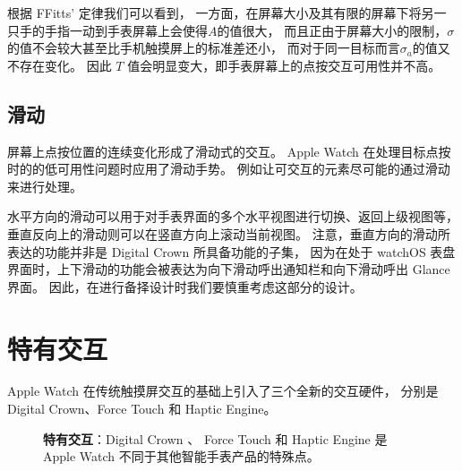根据 FFitts' 定律我们可以看到，
一方面，在屏幕大小及其有限的屏幕下将另一只手的手指一动到手表屏幕上会使得$A$的值很大，
而且正由于屏幕大小的限制，$\sigma$的值不会较大甚至比手机触摸屏上的标准差还小，
而对于同一目标而言$\sigma_a$的值又不存在变化。
因此 $T$ 值会明显变大，即手表屏幕上的点按交互可用性并不高。

\subsection{滑动}

屏幕上点按位置的连续变化形成了滑动式的交互。
Apple Watch 在处理目标点按时的的低可用性问题时应用了滑动手势。
例如让可交互的元素尽可能的通过滑动来进行处理。

水平方向的滑动可以用于对手表界面的多个水平视图进行切换、返回上级视图等，
垂直反向上的滑动则可以在竖直方向上滚动当前视图。
注意，垂直方向的滑动所表达的功能并非是 Digital Crown 所具备功能的子集，
因为在处于 watchOS 表盘界面时，上下滑动的功能会被表达为向下滑动呼出通知栏和向下滑动呼出 Glance 界面。
因此，在进行备择设计时我们要慎重考虑这部分的设计。

\section{特有交互}

Apple Watch 在传统触摸屏交互的基础上引入了三个全新的交互硬件，
分别是Digital Crown、Force Touch 和 Haptic Engine。

\begin{figure}[H]
    \kaishu
    \centering
    \caption{\textbf{特有交互}：Digital Crown 、 Force Touch 和 Haptic Engine 是 Apple Watch 不同于其他智能手表产品的特殊点。}
    \label{fig:special}
\end{figure}

